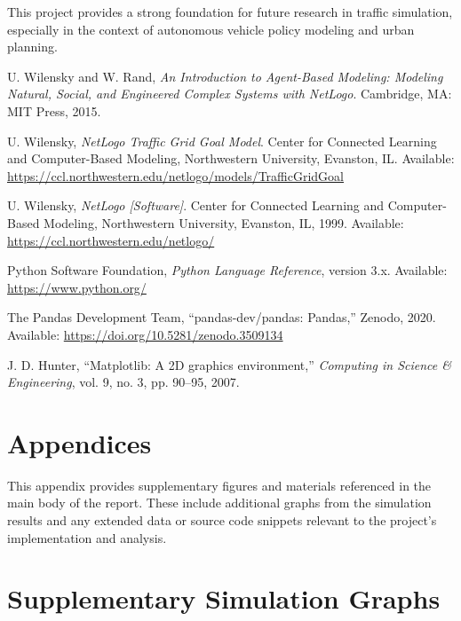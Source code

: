 \documentclass[12pt]{article}
\begin{document}
This project provides a strong foundation for future research in traffic simulation, especially in the context of autonomous vehicle policy modeling and urban planning.

\newpage
\begin{thebibliography}{9}

U. Wilensky and W. Rand, \textit{An Introduction to Agent-Based Modeling: Modeling Natural, Social, and Engineered Complex Systems with NetLogo}. Cambridge, MA: MIT Press, 2015.

U. Wilensky, \textit{NetLogo Traffic Grid Goal Model}. Center for Connected Learning and Computer-Based Modeling, Northwestern University, Evanston, IL. Available: \url{https://ccl.northwestern.edu/netlogo/models/TrafficGridGoal}

U. Wilensky, \textit{NetLogo [Software]}. Center for Connected Learning and Computer-Based Modeling, Northwestern University, Evanston, IL, 1999. Available: \url{https://ccl.northwestern.edu/netlogo/}

Python Software Foundation, \textit{Python Language Reference}, version 3.x. Available: \url{https://www.python.org/}

The Pandas Development Team, “pandas-dev/pandas: Pandas,” Zenodo, 2020. Available: \url{https://doi.org/10.5281/zenodo.3509134}

J. D. Hunter, “Matplotlib: A 2D graphics environment,” \textit{Computing in Science \& Engineering}, vol. 9, no. 3, pp. 90–95, 2007.

\end{thebibliography}

\newpage
\appendix
\section*{Appendices}

This appendix provides supplementary figures and materials referenced in the main body of the report. These include additional graphs from the simulation results and any extended data or source code snippets relevant to the project’s implementation and analysis.

\section{Supplementary Simulation Graphs}
\end{document}
